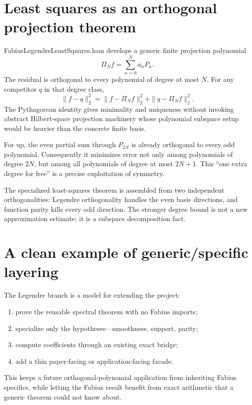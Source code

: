 \documentclass[11pt,a4paper,openany]{book}
\def\module#1{#1.lean}
\def\upfun{up}
\newcommand{\upfun}{\ensuremath{\operatorname{up}}}
\newcommand{\module}[1]{\nolinkurl{#1.lean}}
\begin{document}
\section{Least squares as an orthogonal projection theorem}
\module{FabiusLegendreLeastSquares} develops a generic finite projection
polynomial
\[
 \Pi_N f=\sum_{n=0}^{N}a_nP_n.
\]
The residual is orthogonal to every polynomial of degree at most $N$.  For any
competitor $q$ in that degree class,
\[
 \|f-q\|_2^2
 =\|f-\Pi_Nf\|_2^2+\|q-\Pi_Nf\|_2^2.
\]
The Pythagorean identity gives minimality and uniqueness without invoking
abstract Hilbert-space projection machinery whose polynomial subspace setup
would be heavier than the concrete finite basis.

For \upfun, the even partial sum through $P_{2N}$ is already orthogonal to every
odd polynomial.  Consequently it minimizes error not only among polynomials of
degree $2N$, but among all polynomials of degree at most $2N+1$.  This “one
extra degree for free” is a precise exploitation of symmetry.

\begin{proofidea}
The specialized least-squares theorem is assembled from two independent
orthogonalities: Legendre orthogonality handles the even basis directions, and
function parity kills every odd direction.  The stronger degree bound is not a
new approximation estimate; it is a subspace decomposition fact.
\end{proofidea}

\section{A clean example of generic/specific layering}
The Legendre branch is a model for extending the project:
\begin{enumerate}
  \item prove the reusable spectral theorem with no Fabius imports;
  \item specialize only the hypotheses—smoothness, support, parity;
  \item compute coefficients through an existing exact bridge;
  \item add a thin paper-facing or application-facing facade.
\end{enumerate}
This keeps a future orthogonal-polynomial application from inheriting Fabius
specifics, while letting the Fabius result benefit from exact arithmetic that a
generic theorem could not know about.

\end{document}
